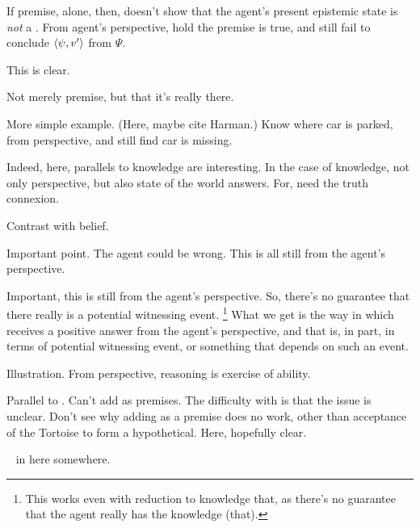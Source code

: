\begin{note}
  \begin{argument}
    If premise, alone, then, doesn't show that the agent's present epistemic state is \emph{not} a \deadEnd{}.
    From agent's perspective, hold the premise is true, and still fail to conclude \(\langle \psi, v' \rangle\) from \(\Psi\).

    This is clear.

    Not merely premise, but that it's really there.

    More simple example.
    (Here, maybe cite Harman.)
    Know where car is parked, from perspective, and still find car is missing.

    Indeed, here, parallels to knowledge are interesting.
    In the case of knowledge, not only perspective, but also state of the world answers.
    For, need the truth connexion.

    Contrast with belief.

    Important point.
    The agent could be wrong.
    This is all still from the agent's perspective.
  \end{argument}

  Important, this is still from the agent's perspective.
  So, there's no guarantee that there really is a potential witnessing event.%
  \footnote{
    This works even with reduction to knowledge that, as there's no guarantee that the agent really has the knowledge (that).
  }
  What we get is the way in which \qzS{} receives a positive answer from the agent's perspective, and that is, in part, in terms of potential witnessing event, or something that depends on such an event.
\end{note}

\begin{note}
  Illustration.
  From perspective, reasoning is exercise of ability.
\end{note}

\begin{note}
  {
    \color{green}
    Parallel to \citeauthor{Carroll:1895uj}.
    Can't add as premises.
    The difficulty with \citeauthor{Carroll:1895uj} is that the issue is unclear.
    Don't see why adding as a premise does no work, other than acceptance of the Tortoise to form a hypothetical.
    Here, hopefully clear.
  }
\end{note}


\begin{note}
  \color{red}

  ~\cite{Besson:2018wz} in here somewhere.
\end{note}


